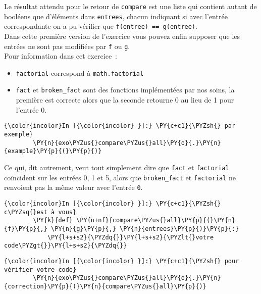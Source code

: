 Le résultat attendu pour le retour de \texttt{compare} est une liste qui
contient autant de booléens que d'éléments dans \texttt{entrees}, chacun
indiquant si avec l'entrée correspondante on a pu vérifier que
\texttt{f(entree)\ ==\ g(entree)}.\\

Dans cette première version de l'exercice vous pouvez enfin supposer que
les entrées ne sont pas modifiées par \texttt{f} ou \texttt{g}.\\

    Pour information dans cet exercice~:
    
\begin{itemize}
	\item 
	\texttt{factorial} correspond à \texttt{math.factorial}
	\item
	\texttt{fact} et \texttt{broken\_fact} sont
	des fonctions implémentées par nos soins, la première est correcte alors
	que la seconde retourne 0 au lieu de 1 pour l'entrée 0.
\end{itemize}

    \begin{Verbatim}[commandchars=\\\{\}]
{\color{incolor}In [{\color{incolor} }]:} \PY{c+c1}{\PYZsh{} par exemple}
        \PY{n}{exo\PYZus{}compare\PYZus{}all}\PY{o}{.}\PY{n}{example}\PY{p}{(}\PY{p}{)}
\end{Verbatim}


    Ce qui, dit autrement, veut tout simplement dire que \texttt{fact} et
\texttt{factorial} coïncident sur les entrées 0, 1 et 5, alors que
\texttt{broken\_fact} et \texttt{factorial} ne renvoient pas la même
valeur avec l'entrée \texttt{0}.

    \begin{Verbatim}[commandchars=\\\{\}]
{\color{incolor}In [{\color{incolor} }]:} \PY{c+c1}{\PYZsh{} c\PYZsq{}est à vous}
        \PY{k}{def} \PY{n+nf}{compare\PYZus{}all}\PY{p}{(}\PY{n}{f}\PY{p}{,} \PY{n}{g}\PY{p}{,} \PY{n}{entrees}\PY{p}{)}\PY{p}{:}
            \PY{l+s+s2}{\PYZdq{}}\PY{l+s+s2}{\PYZlt{}votre code\PYZgt{}}\PY{l+s+s2}{\PYZdq{}}
\end{Verbatim}


    \begin{Verbatim}[commandchars=\\\{\}]
{\color{incolor}In [{\color{incolor} }]:} \PY{c+c1}{\PYZsh{} pour vérifier votre code}
        \PY{n}{exo\PYZus{}compare\PYZus{}all}\PY{o}{.}\PY{n}{correction}\PY{p}{(}\PY{n}{compare\PYZus{}all}\PY{p}{)}
\end{Verbatim}


